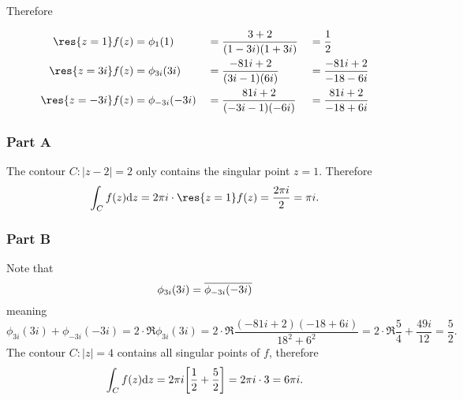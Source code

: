 \documentclass[12pt]{extarticle}
\begin{document}
Therefore

\begin{alignat*}{3}
    \res{z=1} f(z) &= \phi_1(1) &&= \frac{3+2}{(1-3i)(1+3i)} &&= \frac{1}{2} \\
    \res{z=3i} f(z) &= \phi_{3i}(3i) &&= \frac{-81i + 2}{(3i - 1)(6i)} &&= \frac{-81i+2}{-18-6i} \\
    \res{z=-3i} f(z) &= \phi_{-3i}(-3i) &&= \frac{81i + 2}{(-3i - 1)(-6i)} &&= \frac{81i + 2}{-18 + 6i}
\end{alignat*}

\begin{problem} \subsubsection*{Part A}
    The contour $C : |z-2| = 2$ only contains the singular point $z = 1$. Therefore
    \[
        \int_C f(z) \dd z = 2 \pi i \cdot \res{z=1} f(z) = \frac{2 \pi i}{2} = \pi i
    .\]
\end{problem}

\begin{problem} \subsubsection*{Part B}
    Note that
    \[
        \phi_{3i}(3i) = \overline{\phi_{-3i}(-3i)}
    \]
    meaning
    \[
        \phi_{3i}(3i) + \phi_{-3i}(-3i) = 2 \cdot \Re{\phi_{3i}(3i)} = 2 \cdot \Re{\frac{(-81i+2)(-18+6i)}{18^2+6^2}} = 2 \cdot \Re{\frac{5}{4} + \frac{49 i}{12}} = \frac{5}{2}
    .\]
    The contour $C : |z| = 4$ contains all singular points of $f$, therefore
    \[
        \int_C f(z) \dd z = 2 \pi i \qty[
        \frac{1}{2} + \frac{5}{2}
        ] = 2 \pi i \cdot 3 = 6 \pi i
    .\]
\end{problem}
\end{document}
